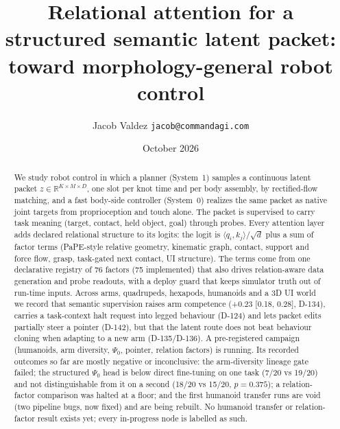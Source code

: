 \documentclass[10pt,twocolumn]{article}
\title{\vspace{-1.6em}\textbf{Relational attention for a structured semantic latent packet:\\toward morphology-general robot control}}
\author{Jacob Valdez \quad \texttt{\small jacob@commandagi.com}}
\date{\small October 2026}
\begin{document}
\makeatletter
{}
\makeatother

\begin{abstract}\noindent
We study robot control in which a planner (System~1) samples a continuous latent packet $z\in\mathbb{R}^{K\times M\times D}$, one slot per knot time and per body assembly, by rectified-flow matching, and a fast body-side controller (System~0) realizes the same packet as native joint targets from proprioception and touch alone. The packet is supervised to carry task meaning (target, contact, held object, goal) through probes. Every attention layer adds declared relational structure to its logits: the logit is $\langle q_i,k_j\rangle/\sqrt d$ plus a sum of factor terms (PaPE-style relative geometry, kinematic graph, contact, support and force flow, grasp, task-gated next contact, UI structure). The terms come from one declarative registry of 76 factors (75 implemented) that also drives relation-aware data generation and probe readouts, with a deploy guard that keeps simulator truth out of run-time inputs. Across arms, quadrupeds, hexapods, humanoids and a 3D UI world we record that semantic supervision raises arm competence (+0.23 [0.18, 0.28], D-134), carries a task-context halt request into legged behaviour (D-124) and lets packet edits partially steer a pointer (D-142), but that the latent route does not beat behaviour cloning when adapting to a new arm (D-135/D-136). A pre-registered campaign (humanoids, arm diversity, $\Psi_0$, pointer, relation factors) is running. Its recorded outcomes so far are mostly negative or inconclusive: the arm-diversity lineage gate failed; the structured $\Psi_0$ head is below direct fine-tuning on one task (7/20 vs 19/20) and not distinguishable from it on a second (18/20 vs 15/20, $p{=}0.375$); a relation-factor comparison was halted at a floor; and the first humanoid transfer runs are void (two pipeline bugs, now fixed) and are being rebuilt. No humanoid transfer or relation-factor result exists yet; every in-progress node is labelled as such.
\end{abstract}
\end{document}
